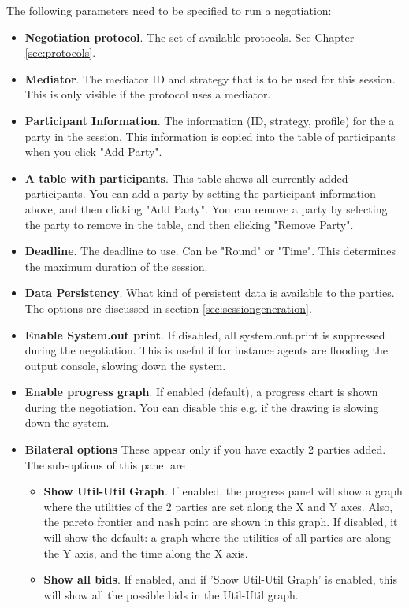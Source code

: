 \documentclass[]{article}
\begin{document}
The following parameters need to be specified to run a negotiation:

\medskip
\begin{minipage}{.8 \textwidth}
\begin{itemize}
	\item \textbf{Negotiation protocol}. The set of available protocols. See Chapter \ref{sec:protocols}.
	\item \textbf{Mediator}. The mediator ID and strategy that is to be used for this session. This is only visible if the protocol uses a mediator.
	\item \textbf{Participant Information}. The information (ID, strategy, profile) for the a party in the session. This information is copied into the table of participants when you click "Add Party".
	\item \textbf{A table with participants}. This table shows all currently added participants. You can add a party by setting the participant information above, and then clicking "Add Party". You can remove a party by selecting the party to remove in the table, and then clicking "Remove Party". 
	\item \textbf{Deadline}. The deadline to use. Can be "Round" or "Time". This determines the maximum duration of the session.
	\item \textbf{Data Persistency}. What kind of persistent data is available to the parties. The options are discussed in section \ref{sec:sessiongeneration}.
	\item \textbf{Enable System.out print}. If disabled, all system.out.print is suppressed during the negotiation. This is useful if for instance agents are flooding the output console, slowing down the system.
		\item \textbf{Enable progress graph}. If enabled (default), a progress chart is shown during the negotiation. You can disable this e.g. if the drawing is slowing down the system.
\item \textbf{Bilateral options} These appear only if you have exactly 2 parties added. The sub-options of this panel are
	\begin{itemize}
	\item \textbf{Show Util-Util Graph}. If enabled, the progress panel will show a graph where the utilities of the 2 parties are set along the X and Y axes. Also, the pareto frontier and nash point are shown in this graph. If disabled, it will show the default: a graph where the utilities of all parties are along the Y axis, and the time along the X axis. 
	\item \textbf{Show all bids}.  If enabled, and if 'Show Util-Util Graph' is enabled, this will show all the possible bids in the Util-Util graph.
	\end{itemize}

\end{itemize}
\end{minipage}
\medskip
\end{document}
